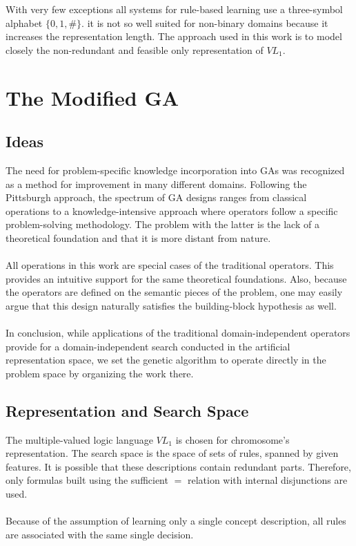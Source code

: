\documentclass[../main.tex]{subfiles}
\begin{document}
With very few exceptions all systems for rule-based learning use a three-symbol alphabet $\{0, 1, \#\}$. it is not so
well suited for non-binary domains because it increases the representation length. The approach used in this work is to
model closely the non-redundant and feasible only representation of $VL_1$.

\section{The Modified GA}

\subsection{Ideas}
The need for problem-specific knowledge incorporation into GAs was recognized as a method for improvement in many
different domains. Following the Pittsburgh approach, the spectrum of GA designs ranges from classical operations to a
knowledge-intensive approach where operators follow a specific problem-solving methodology. The problem with the
latter is the lack of a theoretical foundation and that it is more distant from nature.
\\\\
All operations in this work are special cases of the traditional operators. This provides an intuitive support for the
same theoretical foundations. Also, because the operators are defined on the semantic pieces of the problem, one may
easily argue that this design naturally satisfies the building-block hypothesis as well.
\\\\
In conclusion, while applications of the traditional domain-independent operators provide for a domain-independent
search conducted in the artificial representation space, we set the genetic algorithm to operate directly in the
problem space by organizing the work there.

\subsection{Representation and Search Space}
The multiple-valued logic language $VL_1$ is chosen for chromosome's representation. The search space is the space of
sets of rules, spanned by given features. It is possible that these descriptions contain redundant parts. Therefore,
only formulas built using the sufficient $=$ relation with internal disjunctions are used.
\\\\
Because of the assumption of learning only a single concept description, all rules are associated with the same single
decision.
\end{document}
